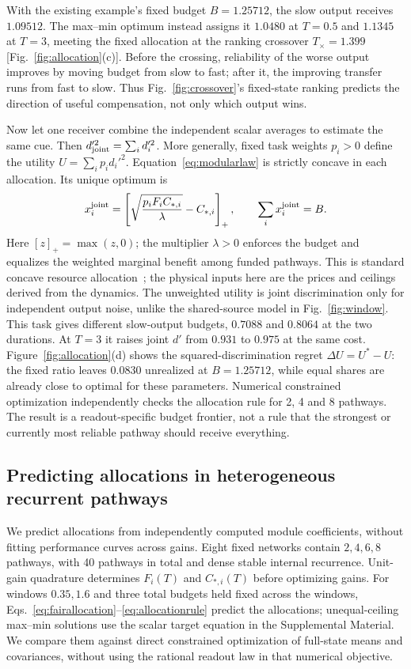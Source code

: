 \documentclass[aps,10pt,onecolumn,superscriptaddress,nofootinbib,longbibliography,
  amsmath,amssymb,floatfix]{revtex4-2}
\begin{document}
With the existing example's fixed budget \(B=1.25712\), the
slow output receives \(1.09512\). The max--min optimum instead
assigns it \(1.0480\) at \(T=0.5\) and \(1.1345\) at \(T=3\),
meeting the fixed allocation at the ranking crossover \(T_\times=1.399\)
[Fig.~\ref{fig:allocation}(c)]. Before the crossing, reliability
of the worse output improves by moving budget from slow to fast;
after it, the improving transfer runs from fast to slow. Thus
Fig.~\ref{fig:crossover}'s fixed-state ranking predicts the
direction of useful compensation, not only which output wins.

Now let one receiver combine the independent scalar averages to
estimate the same cue. Then \(d_{\rm joint}'^2=\sum_i d_i'^2\).
More generally, fixed task weights \(p_i>0\) define the utility
\(U=\sum_i p_i d_i'^2\). Equation~\eqref{eq:modularlaw} is
strictly concave in each allocation. Its unique optimum is
\begin{equation}
 x_i^{\rm joint}=
 \left[\sqrt{\frac{p_i F_i C_{*,i}}{\lambda}}-C_{*,i}\right]_+,
 \qquad \sum_i x_i^{\rm joint}=B.
 \label{eq:allocationrule}
\end{equation}
Here \([z]_+=\max(z,0)\); the multiplier \(\lambda>0\) enforces
the budget and equalizes the weighted marginal benefit among
funded pathways. This is standard concave
resource allocation~\cite{boyd2004convex}; the physical inputs
here are the prices and ceilings derived from the dynamics.
The unweighted utility is joint discrimination only for independent
output noise, unlike the shared-source model in Fig.~\ref{fig:window}.
This task gives different slow-output budgets,
\(0.7088\) and \(0.8064\) at the two durations. At \(T=3\) it
raises joint \(d'\) from \(0.931\) to \(0.975\) at the same
cost. Figure~\ref{fig:allocation}(d) shows the squared-discrimination
regret \(\Delta U=U^*-U\): the fixed ratio leaves \(0.0830\)
unrealized at \(B=1.25712\), while equal shares are already close
to optimal for these parameters. Numerical constrained
optimization independently checks the allocation rule for
2, 4 and 8 pathways. The result is a readout-specific budget
frontier, not a rule that the strongest or currently most
reliable pathway should receive everything.

\subsection{Predicting allocations in heterogeneous recurrent pathways}
\label{sec:recurrentprediction}

We predict allocations from independently computed module
coefficients, without fitting performance curves across gains.
Eight fixed networks contain \(2,4,6,8\) pathways, with 40 pathways
in total and dense stable internal recurrence. Unit-gain quadrature
determines \(F_i(T)\) and \(C_{*,i}(T)\) before optimizing gains.
For windows \(0.35,1.6\) and three total budgets held fixed across
the windows, Eqs.~\eqref{eq:fairallocation}--\eqref{eq:allocationrule}
predict the allocations; unequal-ceiling max--min solutions use
the scalar target equation in the Supplemental Material.
We compare them against direct constrained optimization of
full-state means and covariances, without using the rational
readout law in that numerical objective.
\end{document}
